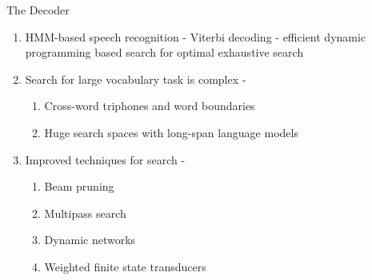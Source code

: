 \begin{frame}{The Decoder}
\begin{enumerate}
\item HMM-based speech recognition - \alert{Viterbi decoding} - efficient dynamic programming based 
search for optimal exhaustive search
\item Search for large vocabulary task is \alert{complex} -
\begin{enumerate}
\item Cross-word triphones and word boundaries
\item Huge search spaces with long-span language models
\end{enumerate}
\item Improved techniques for search -
\begin{enumerate}
\item Beam pruning
\item Multipass search
\item Dynamic networks
\item Weighted finite state transducers
\end{enumerate}
\end{enumerate}
\end{frame}

